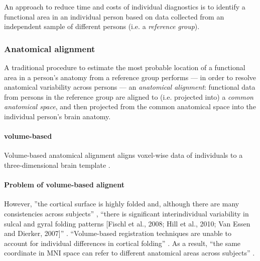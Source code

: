 An approach to reduce time and costs of individual diagnostics is to identify a
functional area in an individual person based on data collected from an
independent sample of different persons (i.e. a \textit{reference group}).


\subsubsection{Anatomical alignment}

%
A traditional procedure \citep{frost2012measuring, weiner2018defining,
zhen2017quantifying, zhen2015quantifying, rosenke2021probabilistic,
wang2015probabilistic} to estimate the most probable location of a functional
area in a person's anatomy from a reference group performs --- in order to
resolve anatomical variability across persons --- an \textit{anatomical
alignment}:
%
functional data from persons in the reference group are aligned to (i.e.
projected into) a \textit{common anatomical space}, and then projected from the
common anatomical space into the individual person's brain anatomy.


\paragraph{volume-based}
Volume-based anatomical alignment \citep[s.][for a review]{klein2009evaluation}
aligns voxel-wise data of individuals to a three-dimensional brain template
\citep[e.g., MNI152 template;][]{fonov2011unbiased}.


\paragraph{Problem of volume-based alignent}

However, ''the cortical surface is highly folded and, although there are many
consistencies across subjects'' \citep{frost2012measuring}, ``there is
significant interindividual variability in sulcal and gyral folding patterns
[Fischl et al., 2008; Hill et al., 2010; Van Essen and Dierker, 2007]''
\citep{zhen2017quantifying}.
%
``Volume-based registration techniques are unable to account for individual
differences in cortical folding'' \citep{frost2012measuring}.
%
As a result, ``the same coordinate in MNI space can refer to different
anatomical areas across subjects'' \citep{frost2012measuring}.



